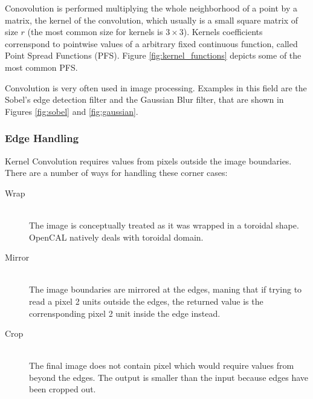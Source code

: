 Conovolution is performed multiplying the whole neighborhood of a point by a  matrix, the kernel of the convolution, which usually is a small square matrix of size $r$ (the most common size for kernels is $3\times 3$).
Kernels coefficients correnspond to pointwise values of a arbitrary fixed continuous function, called Point Spread Functions (PFS). Figure \ref{fig:kernel_functions} depicts some of the most common PFS.

Convolution is very often used in image processing. Examples in this field are the Sobel's edge detection filter and the Gaussian Blur filter, that are shown in Figures \ref{fig:sobel} and \ref{fig:gaussian}.

\subsubsection{Edge Handling}
Kernel Convolution requires values from pixels outside the image boundaries. There are a number of ways for handling these corner cases:
\begin{description}
    \item[Wrap] \hfill \\The image is conceptually treated as it was wrapped in a toroidal shape. OpenCAL natively deals with toroidal domain.
    \item[Mirror] \hfill \\
    The image boundaries are mirrored at the edges, maning that if trying to read a pixel 2 units outside the edges, the returned value is the corrensponding pixel 2 unit inside the edge instead.
    \item [Crop]\hfill \\
    	The final image does not contain pixel which would require values from beyond the edges. The output is smaller than the input because edges have been cropped out.
\end{description}

